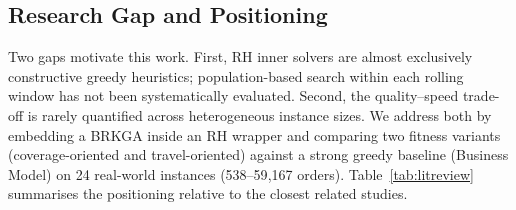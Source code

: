 \subsection{Research Gap and Positioning}\label{subsec:gap}

Two gaps motivate this work.
First, RH inner solvers are almost exclusively constructive greedy
heuristics; population-based search within each rolling window
has not been systematically evaluated.
Second, the quality--speed trade-off is rarely quantified across
heterogeneous instance sizes.
We address both by embedding a BRKGA inside an RH wrapper and
comparing two fitness variants (coverage-oriented and
travel-oriented) against a strong greedy baseline (Business Model)
on 24 real-world instances (538--59{,}167 orders).
Table~\ref{tab:litreview} summarises the positioning relative to
the closest related studies.

